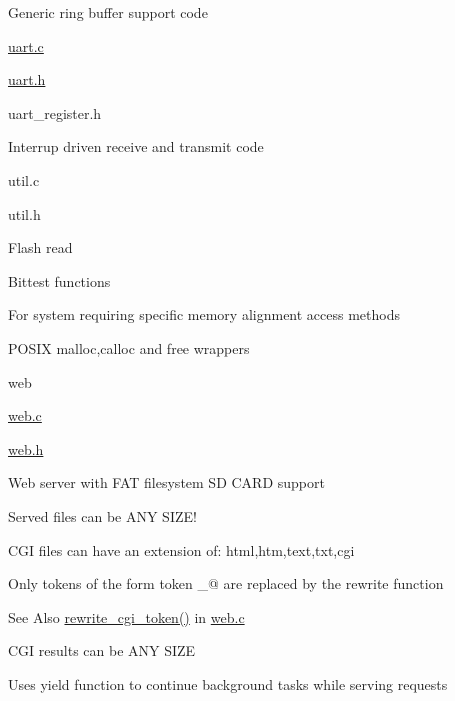 \begin{DoxyItemize}
\begin{DoxyItemize}
\begin{DoxyItemize}
\item Generic ring buffer support code
\end{DoxyItemize}
\item \hyperlink{uart_8c}{uart.\-c}
\item \hyperlink{uart_8h}{uart.\-h}
\item uart\-\_\-register.\-h
\begin{DoxyItemize}
\item Interrup driven receive and transmit code
\end{DoxyItemize}
\item util.\-c
\item util.\-h
\begin{DoxyItemize}
\item Flash read
\item Bittest functions
\begin{DoxyItemize}
\item For system requiring specific memory alignment access methods
\end{DoxyItemize}
\item P\-O\-S\-I\-X malloc,calloc and free wrappers
\end{DoxyItemize}
\end{DoxyItemize}
\item web
\begin{DoxyItemize}
\item \hyperlink{web_8c}{web.\-c}
\item \hyperlink{web_8h}{web.\-h}
\begin{DoxyItemize}
\item Web server with F\-A\-T filesystem S\-D C\-A\-R\-D support
\item Served files can be A\-N\-Y S\-I\-Z\-E!
\item C\-G\-I files can have an extension of\-: html,htm,text,txt,cgi
\begin{DoxyItemize}
\item Only tokens of the form  token \-\_\-@ are replaced by the rewrite function
\begin{DoxyItemize}
\item \begin{DoxySeeAlso}{See Also}
\hyperlink{web_8h_abfb5be0ab21dfe56bc934a8965154384}{rewrite\-\_\-cgi\-\_\-token()} in \hyperlink{web_8c}{web.\-c}
\end{DoxySeeAlso}

\end{DoxyItemize}
\end{DoxyItemize}
\item C\-G\-I results can be A\-N\-Y S\-I\-Z\-E
\item Uses yield function to continue background tasks while serving requests
\end{DoxyItemize}
\end{DoxyItemize}
\end{DoxyItemize}

